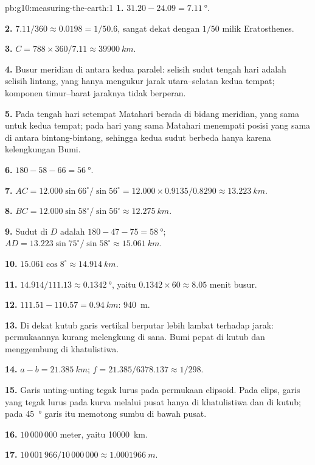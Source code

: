 \begin{solution}{pb:g10:measuring-the-earth:1}
\textbf{1.} $31.20 - 24.09 = \qty{7.11}{\degree}$.

\textbf{2.} $7.11/360 \approx 0.0198 = 1/50.6$, sangat dekat dengan
$1/50$ milik Eratosthenes.

\textbf{3.} $C = 788 \times 360/7.11 \approx \qty{39900}{km}$.

\textbf{4.} Busur meridian di antara kedua paralel: selisih sudut tengah hari
adalah selisih lintang, yang hanya mengukur jarak utara--selatan kedua tempat;
komponen timur--barat jaraknya tidak berperan.

\textbf{5.} Pada tengah hari setempat Matahari berada di bidang meridian, yang
sama untuk kedua tempat; pada hari yang sama Matahari menempati posisi yang
sama di antara bintang-bintang, sehingga kedua sudut berbeda hanya karena
kelengkungan Bumi.

\textbf{6.} $180 - 58 - 66 = \qty{56}{\degree}$.

\textbf{7.} $AC = 12.000 \sin 66^\circ/\sin 56^\circ = 12.000 \times
0.9135/0.8290 \approx \qty{13.223}{km}$.

\textbf{8.} $BC = 12.000 \sin 58^\circ/\sin 56^\circ \approx \qty{12.275}{km}$.

\textbf{9.} Sudut di $D$ adalah $180 - 47 - 75 = \qty{58}{\degree}$;
$AD = 13.223 \sin 75^\circ/\sin 58^\circ \approx \qty{15.061}{km}$.

\textbf{10.} $15.061 \cos 8^\circ \approx \qty{14.914}{km}$.

\textbf{11.} $14.914/111.13 \approx \qty{0.1342}{\degree}$, yaitu
$0.1342 \times 60 \approx 8.05$ menit busur.

\textbf{12.} $111.51 - 110.57 = \qty{0.94}{km}$: \qty{940}{m}.

\textbf{13.} Di dekat kutub garis vertikal berputar lebih lambat terhadap
jarak: permukaannya kurang melengkung di sana. Bumi pepat di kutub dan
menggembung di khatulistiwa.

\textbf{14.} $a - b = \qty{21.385}{km}$; $f = 21.385/6378.137 \approx 1/298$.

\textbf{15.} Garis unting-unting tegak lurus pada permukaan elipsoid. Pada
elips, garis yang tegak lurus pada kurva melalui pusat hanya di khatulistiwa
dan di kutub; pada \qty{45}{\degree} garis itu memotong sumbu di bawah pusat.

\textbf{16.} $10\,000\,000$ meter, yaitu \qty{10000}{km}.

\textbf{17.} $10\,001\,966/10\,000\,000 \approx \qty{1.0001966}{m}$.


\end{solution}

